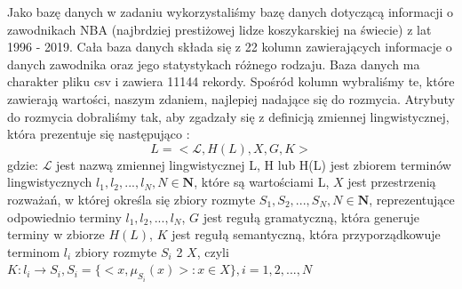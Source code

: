 \documentclass{classrep}
\begin{document}
Jako bazę danych w zadaniu wykorzystaliśmy bazę danych dotyczącą informacji o zawodnikach NBA (najbrdziej prestiżowej lidze koszykarskiej na świecie) z lat 1996 - 2019. Cała baza danych składa się z 22 kolumn zawierających informacje o danych zawodnika oraz jego statystykach różnego rodzaju. Baza danych ma charakter pliku csv i zawiera 11144 rekordy. Spośród kolumn wybraliśmy te, które zawierają wartości, naszym zdaniem, najlepiej nadające się do rozmycia. Atrybuty do rozmycia dobraliśmy tak, aby zgadzały się z definicją zmiennej lingwistycznej, która prezentuje się następująco \cite{niewiadomski19}: 
\begin{equation}
    L=<\mathcal{L}, H(L), X, G, K>
    \label{eqn_zmienna_lingwistyczna}
\end{equation}
gdzie: \newline $\mathcal{L}$ jest nazwą zmiennej lingwistycznej L, \newline H lub H(L) jest zbiorem terminów lingwistycznych $l_1, l_2, ..., l_N, N \in \mathbf{N}$, które są wartościami L, \newline $X$ jest przestrzenią rozważań, w której określa się zbiory rozmyte $S_1, S_2,..., S_N, N \in \mathbf{N}$, reprezentujące odpowiednio terminy $l_1, l_2, ..., l_N$, \newline $G$ jest regułą gramatyczną, która generuje terminy w zbiorze $H(L)$, \newline $K$ jest regułą semantyczną, która przyporządkowuje terminom $l_i$ zbiory rozmyte $S_i$ 2 $X$, czyli $K : l_i \rightarrow S_i, S_i = \{<x,\mu_{S_i}(x)> : x \in X \}, i = 1,2,...,N$
\end{document}
